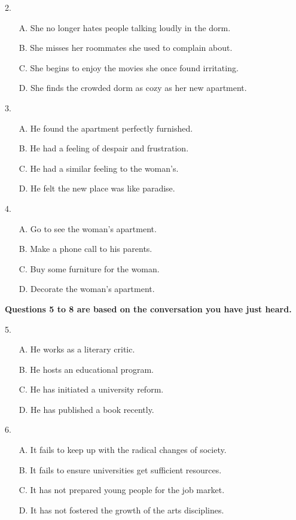 \documentclass[UTF8,11pt]{ctexart}
\begin{document}
2.


\begin{itemize}[leftmargin=2em,itemsep=.2em,topsep=.4em]\item[A.] She no longer hates people talking loudly in the dorm.
\item[B.] She misses her roommates she used to complain about.
\item[C.] She begins to enjoy the movies she once found irritating.
\item[D.] She finds the crowded dorm as cozy as her new apartment.
\end{itemize}

3.


\begin{itemize}[leftmargin=2em,itemsep=.2em,topsep=.4em]\item[A.] He found the apartment perfectly furnished.
\item[B.] He had a feeling of despair and frustration.
\item[C.] He had a similar feeling to the woman’s.
\item[D.] He felt the new place was like paradise.
\end{itemize}

4.


\begin{itemize}[leftmargin=2em,itemsep=.2em,topsep=.4em]\item[A.] Go to see the woman’s apartment.
\item[B.] Make a phone call to his parents.
\item[C.] Buy some furniture for the woman.
\item[D.] Decorate the woman’s apartment.
\end{itemize}

\textbf{Questions 5 to 8 are based on the conversation you have just heard.}


5.


\begin{itemize}[leftmargin=2em,itemsep=.2em,topsep=.4em]\item[A.] He works as a literary critic.
\item[B.] He hosts an educational program.
\item[C.] He has initiated a university reform.
\item[D.] He has published a book recently.
\end{itemize}

6.


\begin{itemize}[leftmargin=2em,itemsep=.2em,topsep=.4em]\item[A.] It fails to keep up with the radical changes of society.
\item[B.] It fails to ensure universities get sufficient resources.
\item[C.] It has not prepared young people for the job market.
\item[D.] It has not fostered the growth of the arts disciplines.
\end{itemize}
\end{document}
